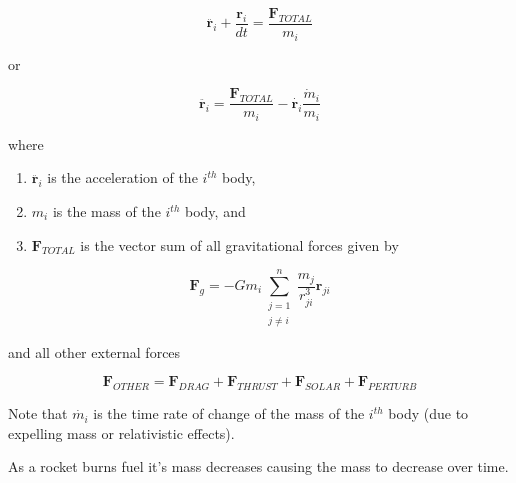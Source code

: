 \documentclass[11pt]{article}
\begin{document}
    \begin{equation}
        \ddot{\mathbf{r}_{i}} + \frac{\mathbf{r}_{i}}{dt} = \frac{\mathbf{F}_{TOTAL}}{m_{i}}
        \label{eq:general_equation_motion}
    \end{equation}

    \vspace{10mm} %

    or

    \vspace{10mm} %

    \begin{equation}
        \ddot{\mathbf{r}_{i}} = \frac{\mathbf{F}_{TOTAL}}{m_{i}} - \dot{\mathbf{r}_{i}} \frac{\dot{m}_{i}}{m_{i}}
        \label{eq:general_equation_motion_simplified}
    \end{equation}

    where

    \begin{enumerate}[label=\alph*)]
        \item $\ddot{\mathbf{r}_{i}}$ is the acceleration of the ${i}^{th}$ body,
        \item ${m}_{i}$ is the mass of the ${i}^{th}$ body, and
        \item $\mathbf{F}_{TOTAL}$ is the vector sum of all gravitational forces given by
    \end{enumerate}

    \begin{equation}
        \mathbf{F}_{g} = -G m_{i}\sum_{\substack{j=1 \\ j \neq i}}^{n} \frac{m_{j}}{r_{ji}^{3}} \mathbf{r}_{ji}
        \label{eq:vector_sum_gravitational_forces_2}
    \end{equation}

    \vspace{10mm} %

    and all other external forces

    \begin{equation}
        \mathbf{F}_{OTHER} = \mathbf{F}_{DRAG} + \mathbf{F}_{THRUST} + \mathbf{F}_{SOLAR} + \mathbf{F}_{PERTURB}
        \label{eq:other_external_forces}
    \end{equation}

    \vspace{10mm} %

    Note that $\dot{{m}_{i}}$ is the time rate of change of the mass of the ${i}^{th}$ body (due to expelling mass
    or relativistic effects).

    \vspace{10mm} %

    As a rocket burns fuel it's mass decreases causing the mass to decrease over time.
\end{document}
